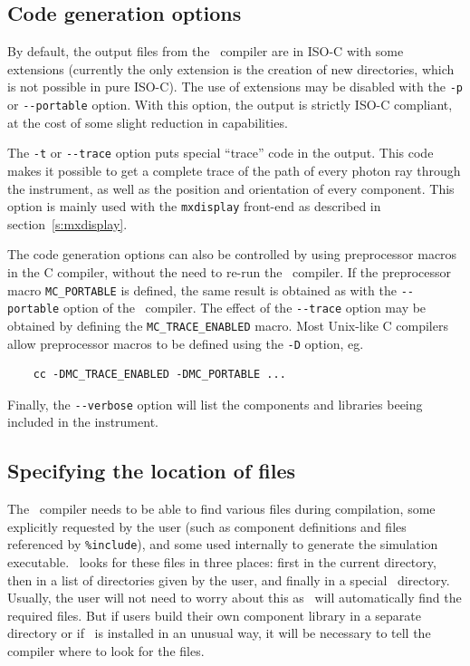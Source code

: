 \subsection{Code generation options}

By default, the output files from the \MCX\ compiler are in ISO-C with
some extensions (currently the only extension is the creation of new
directories, which is not possible in pure ISO-C). The use of
extensions may be disabled with the \verb+-p+ or \verb+--portable+
option. With this option, the output is strictly ISO-C compliant, at
the cost of some slight reduction in capabilities.

The \verb+-t+ or \verb+--trace+ option puts special ``trace'' code in
the output. This code makes it possible to get a complete trace of the
path of every photon ray through the instrument, as well as the position
and orientation of every component. This option is mainly used with the
\verb+mxdisplay+ front-end as described in section~\ref{s:mxdisplay}.

The code generation options can also be controlled by using preprocessor
macros in the C compiler, without the need to re-run the \MCX\
compiler. If the preprocessor macro \verb+MC_PORTABLE+ is defined, the
same result is obtained as with the \verb+--portable+ option of the
\MCX\ compiler. The effect of the \verb+--trace+ option may be obtained
by defining the \verb+MC_TRACE_ENABLED+ macro. Most Unix-like C
compilers allow preprocessor macros to be defined using the \verb+-D+
option, eg.
\begin{verbatim}
    cc -DMC_TRACE_ENABLED -DMC_PORTABLE ...
\end{verbatim}
Finally, the \verb+--verbose+ option will list the components and libraries beeing
included in the instrument.

\subsection{Specifying the location of files}
\label{s:files}

The \MCX\ compiler needs to be able to find various files during
compilation, some explicitly requested by the user (such as component
definitions and files referenced by \verb+%include+), 
and some used internally to generate the simulation executable. \MCX\ looks for these
files in three places: first in the current directory, then in a list of
directories given by the user, and finally in a special \MCX\
directory. Usually, the user will not need to worry about this as \MCX\
will automatically find the required files. But if users build their own
component library in a separate directory or if \MCX\ is installed in an
unusual way, it will be necessary to tell the compiler where to look
for the files.

